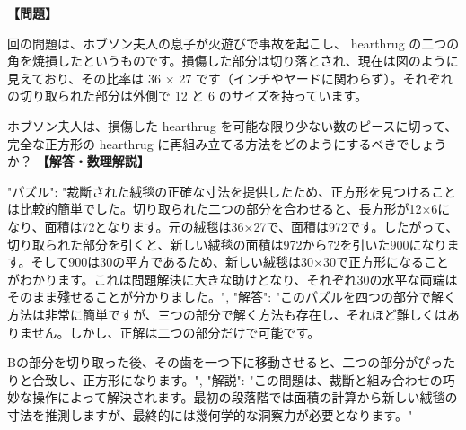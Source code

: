 \documentclass[10pt,a4paper,oneside,openany]{ltjsbook}
\begin{document}
\begin{tcolorbox}[colback=softblue,colframe=primaryblue,title=\textbf{第 154 問：MRS. HOBSON'S HEARTHRUG.},arc=2mm,boxrule=1pt,breakable]
\textbf{【問題】}\par\vspace{0.3em}
回の問題は、ホブソン夫人の息子が火遊びで事故を起こし、 hearthrug の二つの角を焼損したというものです。損傷した部分は切り落とされ、現在は図のように見えており、その比率は 36 × 27 です（インチやヤードに関わらず）。それぞれの切り取られた部分は外側で 12 と 6 のサイズを持っています。

ホブソン夫人は、損傷した hearthrug を可能な限り少ない数のピースに切って、完全な正方形の hearthrug に再組み立てる方法をどのようにするべきでしょうか？
\tcblower
\textbf{【解答・数理解説】}\par\vspace{0.3em}
{
  "パズル": "裁斷された絨毯の正確な寸法を提供したため、正方形を見つけることは比較的簡単でした。切り取られた二つの部分を合わせると、長方形が12×6になり、面積は72となります。元の絨毯は36×27で、面積は972です。したがって、切り取られた部分を引くと、新しい絨毯の面積は972から72を引いた900になります。そして900は30の平方であるため、新しい絨毯は30×30で正方形になることがわかります。これは問題解決に大きな助けとなり、それぞれ30の水平な両端はそのまま殘せることが分かりました。",
  "解答": "このパズルを四つの部分で解く方法は非常に簡単ですが、三つの部分で解く方法も存在し、それほど難しくはありません。しかし、正解は二つの部分だけで可能です。

Bの部分を切り取った後、その歯を一つ下に移動させると、二つの部分がぴったりと合致し、正方形になります。",
  "解説": "この問題は、裁斷と組み合わせの巧妙な操作によって解決されます。最初の段落階では面積の計算から新しい絨毯の寸法を推測しますが、最終的には幾何学的な洞察力が必要となります。"
}
\end{tcolorbox}
\end{document}
